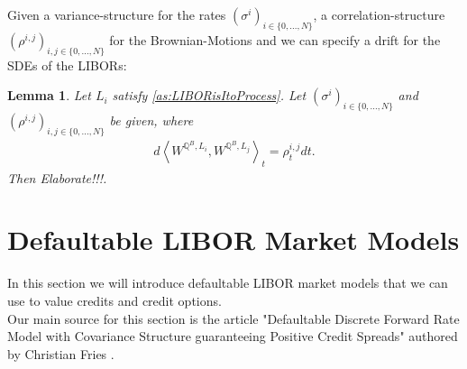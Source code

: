 \documentclass[12pt]{article}
\newtheorem{lemma}[theorem]{Lemma}
\begin{document}
	Given a variance-structure for the rates $(\sigma^i)_{i\in\{0,...,N\}}$, a correlation-structure $(\rho^{i,j})_{i,j \in \{0,...,N\}}$ for the Brownian-Motions and 
	we can specify a drift for the SDEs of the LIBORs:
	\begin{lemma}
		Let $L_i$ satisfy \cref{as:LIBORisItoProcess}. Let $(\sigma^i)_{i\in\{0,...,N\}}$ and $(\rho^{i,j})_{i,j \in \{0,...,N\}}$ be given, where
		\begin{align*}
			d\left\langle W^{\mathbb{Q}^B, L_i}, W^{\mathbb{Q}^B, L_j} \right\rangle_t = \rho^{i,j}_t dt.
		\end{align*}
		Then  \color{red}Elaborate!!!\color{black}. 
		
	\end{lemma}
	
	
	
	
	
	\pagebreak
	\section{Defaultable LIBOR Market Models}
	
	In this section we will introduce defaultable LIBOR market models that we can use to value credits and credit options.\\
	Our main source for this section is the article "Defaultable Discrete Forward Rate Model with Covariance Structure guaranteeing Positive Credit Spreads" authored by Christian Fries \cite{FriesDLMM}.
\end{document}

